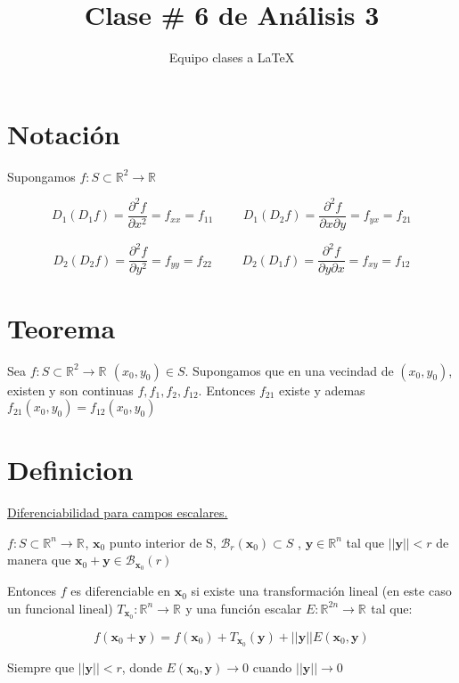 \documentclass[12pt]{article}
\title{Clase \# 6 de Análisis 3}
\author{Equipo clases a \LaTeX}
\newcommand{\teorema}{\section{Teorema}}
\newcommand{\definicion}{\section{Definicion}}
\newcommand{\Rn}[1]{\mathbb{R}^{#1}}
\newcommand{\vect}[1]{\textbf{#1}}
\newcommand{\vecti}[2]{\textbf{#1}_{#2}}
\newcommand{\bola}[2]{\mathcal{B}_{#1}(#2)}
\begin{document}
	
	\maketitle
	
	\tableofcontents
	
	\section{Notación}
	
	Supongamos $f:S \subset \Rn{2} \rightarrow \Rn{}$
	
	$$ D_1(D_1 f)  = \dfrac{\partial^2 f}{\partial x^2} = f_{xx} = f_{11}
	\hspace{1cm} D_1(D_2f) = \dfrac{\partial^2 f}{\partial x \partial y} = f_{yx} = f_{21}$$
	
	$$ D_2(D_2 f)  = \dfrac{\partial^2 f}{\partial y^2} = f_{yy} = f_{22}
	\hspace{1cm} D_2(D_1f) = \dfrac{\partial^2 f}{\partial y \partial x} = f_{xy} = f_{12}$$
	
	\teorema
	
	Sea $f:S \subset \Rn{2} \rightarrow \Rn{}$ $(x_0,y_0) \in S$. Supongamos que en una vecindad de $(x_0,y_0)$, existen y son continuas $f,f_1,f_2,f_{12}$. Entonces $f_{21}$ existe y ademas $f_{21}(x_0,y_0) = f_{12}(x_0,y_0)$
	
	\definicion
	
	\underline{Diferenciabilidad para campos escalares.}
	
	\bigskip
	
	$f:S \subset \Rn{n} \rightarrow \Rn{}$, $\vecti{x}{0}$ punto interior de S, $\bola{r}{\vecti{x}{0}} \subset S$ , $\vect{y} \in \Rn{n}$ tal que $||\vect{y}|| < r$ de manera que $\vecti{x}{0} + \textbf{y} \in \bola{\vecti{x}{0}}{r}$
	
	Entonces $f$ es diferenciable en $\vecti{x}{0}$ si existe una transformación lineal (en este caso un funcional lineal) $T_{\vecti{x}{0}}: \Rn{n} \rightarrow \Rn{}$ y una función escalar $E:\Rn{2n} \rightarrow \Rn{}$ tal que:
	
	\begin{equation}
		f(\vecti{x}{0} + \textbf{y}) = f(\vecti{x}{0}) + T_{\vecti{x}{0}}(\textbf{y}) + ||\textbf{y}||E(\vecti{x}{0} , \textbf{y})
	\end{equation}
	
	Siempre que $||\textbf{y}|| < r$, donde $E(\vecti{x}{0} , \textbf{y}) \rightarrow 0$ cuando $||\textbf{y}|| \rightarrow 0$
	
	\bigskip
	
\end{document}
